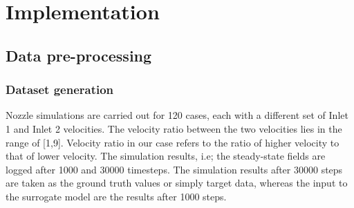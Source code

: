 \chapter{Implementation}
\label{chap:Method}
\section{Data pre-processing}
\subsection{Dataset generation}
Nozzle simulations are carried out for 120 cases, each with a different set of Inlet 1 and Inlet 2 velocities. The velocity ratio between the two velocities lies in the range of [1,9]. Velocity ratio in our case refers to the ratio of higher velocity to that of lower velocity.
The simulation results, i.e; the steady-state fields are logged after 1000 and 30000 timesteps. The simulation results after 30000 steps are taken as the ground truth values or simply target data, whereas the input to the surrogate model are the results after 1000 steps. 
